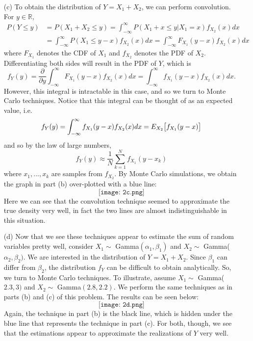 \documentclass[11pt]{article}
\begin{document}
\begin{itemize}
\item[(c)] To obtain the distribution of $Y=X_1+X_2$, we can perform convolution.  For $y\in\mathbb{R}$,
\begin{align*}
P(Y\leq y) &= P(X_1+X_2\leq y) = \int_{-\infty}^\infty P(X_1 + x \leq y|X_1=x)f_{X_2}(x)dx \\
&= \int_{-\infty}^\infty P(X_1\leq y-x)f_{X_2}(x)dx =  \int_{-\infty}^\infty F_{X_1}(y-x)f_{X_2}(x)dx
\end{align*}
where $F_{X_1}$ denotes the CDF of $X_1$ and $f_{X_2}$ denotes the PDF of $X_2$.  Differentiating both sides will result in the PDF of $Y$, which is
\[
f_Y(y) = \frac{\partial}{\partial y} \int_{-\infty}^\infty F_{X_1}(y-x)f_{X_2}(x)dx = \int_{-\infty}^\infty f_{X_1}(y-x)f_{X_2}(x)dx.
\]
However, this integral is intractable in this case, and so we turn to Monte Carlo techniques.  Notice that this integral can be thought of as an expected value, i.e.
\[
f_Y(y) = \int_{-\infty}^\infty f_{X_1}(y-x)f_{X_2}(x)dx = E_{X_2}\big{[}f_{X_1}(y-x)\big{]}
\]
and so by the law of large numbers,
\[
f_Y(y) \approx \frac{1}{N}\sum_{k=1}^N f_{X_1}(y-x_k)
\]
where $x_1,...,x_k$ are samples from $f_{X_2}$.  By Monte Carlo simulations, we obtain the graph in part (b) over-plotted with a blue line:
\[\texttt{[image: 2c.png]}\]
Here we can see that the convolution technique seemed to approximate the true density very well, in fact the two lines are almost indistinguishable in this situation.
\item[(d)]  Now that we see these techniques appear to estimate the sum of random variables pretty well, consider $X_1 \sim$ Gamma$(\alpha_1,\beta_1)$ and $X_2 \sim$ Gamma($\alpha_2,\beta_2)$.  We are interested in the distribution of $Y=X_1+X_2$.  Since $\beta_1$ can differ from $\beta_2$, the distribution $f_Y$ can be difficult to obtain analytically.  So, we turn to Monte Carlo techniques.  To illustrate, assume $X_1 \sim $ Gamma($2.3, 3)$ and $X_2\sim$ Gamma$(2.8,2.2)$.  We perform the same techniques as in parts (b) and (c) of this problem.  The results can be seen below:
\[
\texttt{[image: 2d.png]}
\]
Again, the technique in part (b) is the black line, which is hidden under the blue line that represents the technique in part (c).  For both, though, we see that the estimations appear to approximate the realizations of $Y$ very well.
\end{itemize}
\end{document}
